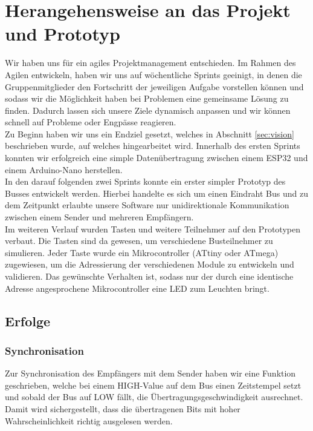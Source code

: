 \section{Herangehensweise an das Projekt und Prototyp}
Wir haben uns für ein agiles Projektmanagement entschieden. Im Rahmen des Agilen entwickeln, haben wir uns auf wöchentliche Sprints geeinigt, in denen die Gruppenmitglieder den Fortschritt der jeweiligen Aufgabe vorstellen können und sodass wir die Möglichkeit haben bei Problemen eine gemeinsame Lösung zu finden. Dadurch lassen sich unsere Ziele dynamisch anpassen und wir können schnell auf Probleme oder Engpässe reagieren.\\

Zu Beginn haben wir uns ein Endziel gesetzt, welches in Abschnitt \ref{sec:vision} beschrieben wurde, auf welches hingearbeitet wird. Innerhalb des ersten Sprints konnten wir erfolgreich eine simple Datenübertragung zwischen einem ESP32 und einem Arduino-Nano herstellen.\\

In den darauf folgenden zwei Sprints konnte ein erster simpler Prototyp des Busses entwickelt werden. Hierbei handelte es sich um einen Eindraht Bus und zu dem Zeitpunkt erlaubte unsere Software nur unidirektionale Kommunikation zwischen einem Sender und mehreren Empfängern.\\

Im weiteren Verlauf wurden Tasten und weitere Teilnehmer auf den Prototypen verbaut. Die Tasten sind da gewesen, um verschiedene Busteilnehmer zu simulieren. Jeder Taste wurde ein Mikrocontroller (ATtiny oder ATmega) zugewiesen, um die Adressierung der verschiedenen Module zu entwickeln und validieren. Das gewünschte Verhalten ist, sodass nur der durch eine identische Adresse angesprochene Mikrocontroller eine LED zum Leuchten bringt.

\subsection{Erfolge}
\subsubsection{Synchronisation}
Zur Synchronisation des Empfängers mit dem Sender haben wir eine Funktion geschrieben, welche bei einem HIGH-Value auf dem Bus einen Zeitstempel setzt und sobald der Bus auf LOW fällt, die Übertragungsgeschwindigkeit ausrechnet. Damit wird sichergestellt, dass die übertragenen Bits mit hoher Wahrscheinlichkeit richtig ausgelesen werden.

